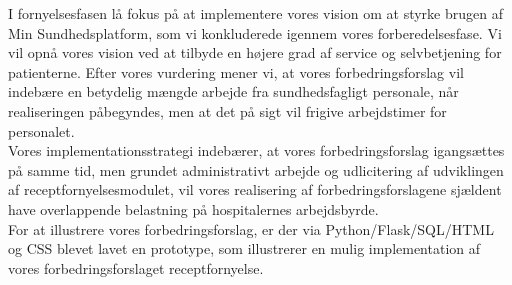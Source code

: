 I fornyelsesfasen lå fokus på at implementere vores vision om at styrke brugen af Min Sundhedsplatform, som vi konkluderede igennem vores forberedelsesfase. Vi vil opnå vores vision ved at tilbyde en højere grad af service og selvbetjening for patienterne.
Efter vores vurdering mener vi, at vores forbedringsforslag vil indebære en betydelig mængde arbejde fra sundhedsfagligt personale, når realiseringen påbegyndes, men at det på sigt vil frigive arbejdstimer for personalet.\\
Vores implementationsstrategi indebærer, at vores forbedringsforslag igangsættes på samme tid, men grundet administrativt arbejde og udlicitering af udviklingen af receptfornyelsesmodulet, vil vores realisering af forbedringsforslagene sjældent have overlappende belastning på hospitalernes arbejdsbyrde.\\
For at illustrere vores forbedringsforslag, er der via Python/Flask/SQL/HTML og CSS blevet lavet en prototype, som illustrerer en mulig implementation af vores forbedringsforslaget receptfornyelse.\\
